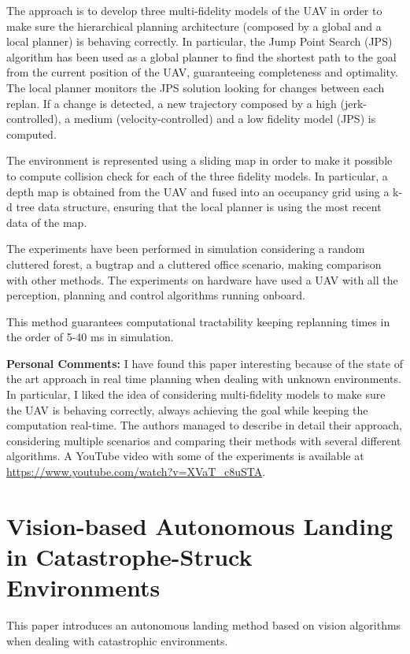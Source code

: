 \documentclass[a4paper]{article}
\begin{document}
The approach is to develop
three multi-fidelity models of the UAV in order to make sure the hierarchical
planning architecture (composed by a global and a local planner)
is behaving correctly. In particular, the Jump Point Search (JPS) algorithm has been
used as a global planner to find the shortest path to the goal from the
current position of the UAV, guaranteeing completeness and optimality. The local
planner monitors the JPS solution looking for changes between each replan. If
a change is detected, a new trajectory composed by a high (jerk-controlled),
a medium (velocity-controlled) and a low fidelity
model (JPS) is computed.

The environment is represented using a sliding map in order to make it possible to
compute collision check for each of the three fidelity models. In particular,
a depth map is obtained from the UAV and fused into an occupancy grid using a
k-d tree data structure, ensuring that the local planner is using the most
recent data of the map.

The experiments have been performed in simulation considering
a random cluttered forest, a bugtrap and a cluttered office scenario,
making comparison with other methods. The experiments on hardware have used
a UAV with all the perception, planning and control algorithms running
onboard.

This method guarantees computational tractability keeping
replanning times in the order of 5-40 ms in simulation.

\textbf{Personal Comments:} I have found this paper interesting because of
the state of the art approach in real time planning when dealing with
unknown environments. In particular, I liked the idea of considering
multi-fidelity models to make sure the UAV is behaving correctly, always
achieving the goal while keeping the computation real-time. The authors
managed to describe in detail their approach, considering multiple
scenarios and comparing their methods with several different algorithms.
A YouTube video with some of the experiments is available at
\url{https://www.youtube.com/watch?v=XVaT_c8uSTA}.

\section{Vision-based Autonomous Landing in Catastrophe-Struck Environments}
This paper \cite{DBLP:journals/corr/abs-1809-05700} introduces an
autonomous landing method based on vision algorithms when dealing with
catastrophic environments.
\end{document}

